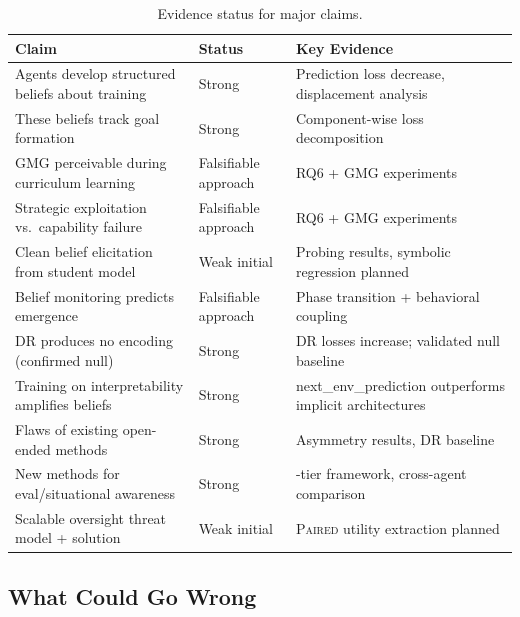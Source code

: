 \documentclass[11pt,a4paper]{article}
\theoremstyle{remark}
\newcommand{\paired}{\textsc{Paired}}
\begin{document}
\begin{table}[H]
\centering
\caption{Evidence status for major claims.}
\begin{tabularx}{\textwidth}{X >{\raggedright\arraybackslash}p{2.5cm} >{\raggedright\arraybackslash}p{4.5cm}}
\toprule
\textbf{Claim} & \textbf{Status} & \textbf{Key Evidence} \\
\midrule
Agents develop structured beliefs about training & Strong & Prediction loss decrease, displacement analysis \\
These beliefs track goal formation & Strong & Component-wise loss decomposition \\
GMG perceivable during curriculum learning & Falsifiable approach & RQ6 + GMG experiments \\
Strategic exploitation vs.\ capability failure & Falsifiable approach & RQ6 + GMG experiments \\
Clean belief elicitation from student model & Weak initial & Probing results, symbolic regression planned \\
Belief monitoring predicts emergence & Falsifiable approach & Phase transition + behavioral coupling \\
DR produces no encoding (confirmed null) & Strong & DR losses increase; validated null baseline \\
Training on interpretability amplifies beliefs & Strong & next\_env\_prediction outperforms implicit architectures \\
Flaws of existing open-ended methods & Strong & Asymmetry results, DR baseline \\
New methods for eval/situational awareness & Strong & 4-tier framework, cross-agent comparison \\
Scalable oversight threat model + solution & Weak initial & \paired{} utility extraction planned \\
\bottomrule
\end{tabularx}
\end{table}

\subsection{What Could Go Wrong}
\end{document}
